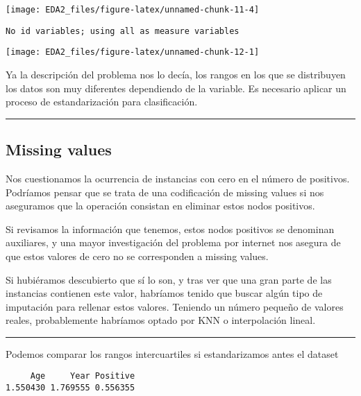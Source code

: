 \documentclass[
]{article}
\begin{document}
\begin{center}\texttt{[image: EDA2\_files/figure-latex/unnamed-chunk-11-4]} \end{center}

\begin{verbatim}
No id variables; using all as measure variables
\end{verbatim}

\begin{center}\texttt{[image: EDA2\_files/figure-latex/unnamed-chunk-12-1]} \end{center}

Ya la descripción del problema nos lo decía, los rangos en los que se
distribuyen los datos son muy diferentes dependiendo de la variable. Es
necesario aplicar un proceso de estandarización para clasificación.

\begin{center}\rule{0.5\linewidth}{0.5pt}\end{center}

\hypertarget{missing-values}{%
\subsection{Missing values}\label{missing-values}}

Nos cuestionamos la ocurrencia de instancias con cero en el número de
positivos. Podríamos pensar que se trata de una codificación de missing
values si nos aseguramos que la operación consistan en eliminar estos
nodos positivos.

Si revisamos la información que tenemos, estos nodos positivos se
denominan auxiliares, y una mayor investigación del problema por
internet nos asegura de que estos valores de cero no se corresponden a
missing values.

Si hubiéramos descubierto que sí lo son, y tras ver que una gran parte
de las instancias contienen este valor, habríamos tenido que buscar
algún tipo de imputación para rellenar estos valores. Teniendo un número
pequeño de valores reales, probablemente habríamos optado por KNN o
interpolación lineal.

\begin{center}\rule{0.5\linewidth}{0.5pt}\end{center}

Podemos comparar los rangos intercuartiles si estandarizamos antes el
dataset

\begin{verbatim}
     Age     Year Positive 
1.550430 1.769555 0.556355 
\end{verbatim}
\end{document}
